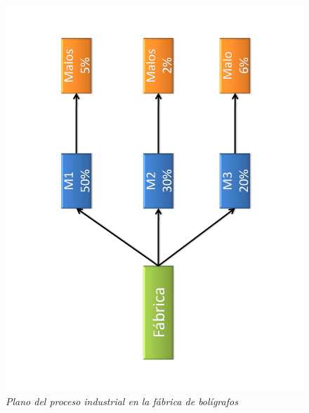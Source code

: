 \documentclass[10pt,openright]{book}\usepackage[]{graphicx}\usepackage[]{color}
\begin{document}
\begin{Eje}
\begin{figure}[!h]
\centering
\includegraphics[angle=-90, scale=0.5]{Fabrica1.pdf}
\caption{\emph{Plano del proceso industrial en la fábrica de bolígrafos}}
\end{figure}


\end{Eje}
\end{document}
